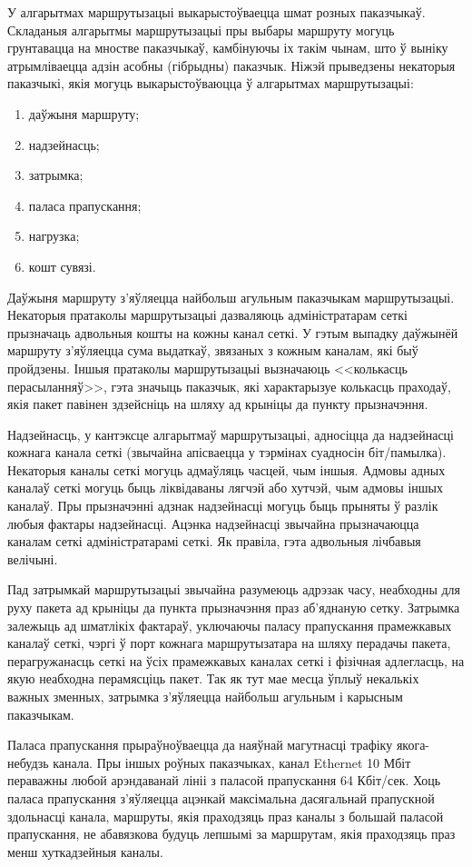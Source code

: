 У алгарытмах маршрутызацыі выкарыстоўваецца шмат розных паказчыкаў. Складаныя алгарытмы маршрутызацыі пры выбары маршруту могуць грунтавацца на мностве паказчыкаў, камбінуючы іх такім чынам, што ў выніку атрымліваецца адзін асобны (гібрыдны) паказчык. Ніжэй прыведзены некаторыя паказчыкі, якія могуць выкарыстоўваюцца ў алгарытмах маршрутызацыі:
\begin{enumerate}
    \item даўжыня маршруту;
    \item надзейнасць;
    \item затрымка;
    \item паласа прапускання;
    \item нагрузка;
    \item кошт сувязі.
\end{enumerate}

Даўжыня маршруту з'яўляецца найбольш агульным паказчыкам маршрутызацыі. Некаторыя пратаколы маршрутызацыі дазваляюць адміністратарам сеткі прызначаць адвольныя кошты на кожны канал сеткі. У гэтым выпадку даўжынёй маршруту з'яўляецца сума выдаткаў, звязаных з кожным каналам, які быў пройдзены. Іншыя пратаколы маршрутызацыі вызначаюць <<колькасць перасыланняў>>, гэта значыць паказчык, які характарызуе колькасць праходаў, якія пакет павінен здзейсніць на шляху ад крыніцы да пункту прызначэння.

Надзейнасць, у кантэксце алгарытмаў маршрутызацыі, адносіцца да надзейнасці кожнага канала сеткі (звычайна апісваецца у тэрмінах суадносін біт/памылка). Некаторыя каналы сеткі могуць адмаўляць часцей, чым іншыя. Адмовы адных каналаў сеткі могуць быць ліквідаваны лягчэй або хутчэй, чым адмовы іншых каналаў. Пры прызначэнні адзнак надзейнасці могуць быць прыняты ў разлік любыя фактары надзейнасці. Ацэнка надзейнасці звычайна прызначаюцца каналам сеткі адміністратарамі сеткі. Як правіла, гэта адвольныя лічбавыя велічыні.

Пад затрымкай маршрутызацыі звычайна разумеюць адрэзак часу, неабходны для руху пакета ад крыніцы да пункта прызначэння праз аб'яднаную сетку. Затрымка залежыць ад шматлікіх фактараў, уключаючы паласу прапускання прамежкавых каналаў сеткі, чэргі ў порт кожнага
маршрутызатара на шляху перадачы пакета, перагружанасць сеткі на ўсіх прамежкавых каналах сеткі і фізічная адлегласць, на якую неабходна перамясціць пакет. Так як тут мае месца ўплыў некалькіх важных зменных, затрымка з'яўляецца найбольш агульным і карысным паказчыкам.

Паласа прапускання прыраўноўваецца да наяўнай магутнасці трафіку якога-небудзь канала. Пры іншых роўных паказчыках, канал Ethernet 10 Мбіт пераважны любой арэндаванай лініі з паласой прапускання 64 Кбіт/сек. Хоць паласа прапускання з'яўляецца ацэнкай максімальна дасягальнай прапускной здольнасці канала, маршруты, якія праходзяць праз каналы з большай паласой прапускання, не абавязкова будуць лепшымі за маршрутам, якія праходзяць праз менш хуткадзейныя каналы.

